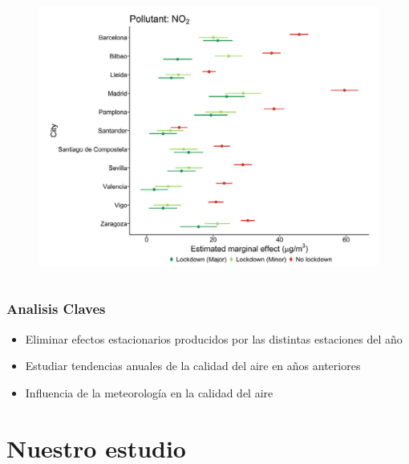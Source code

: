 \documentclass[xcolor=dvipsnames]{beamer}
\begin{document}
\begin{frame}
\begin{itemize}
\begin{columns}
                            \begin{column}{0.4\linewidth}
                                \begin{figure}[H]
                                    \includegraphics[width=.8\linewidth]{./figures/brizRedon.png}
                                \end{figure}
                            \end{column}
                        \end{columns}
                \end{itemize}
			\end{frame}

			\begin{frame}
				\frametitle{Analisis Claves}

                \begin{itemize}
                    \item<1->{Eliminar efectos estacionarios producidos por las distintas
                              estaciones del año}

                    \item<2->{Estudiar tendencias anuales de la calidad del aire en años anteriores}

                    \item<3->{Influencia de la meteorología en la calidad del aire}
                \end{itemize}
			\end{frame}
		\section{Nuestro estudio}
\end{document}
